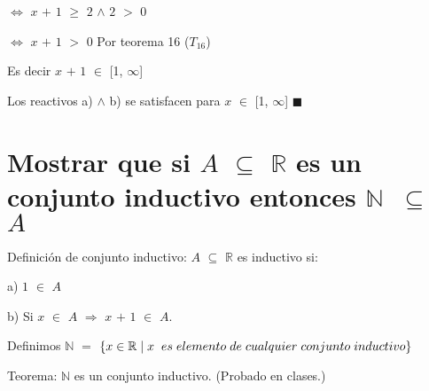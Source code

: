 \documentclass[12pt]{article}
\renewcommand{\qedsymbol}{$\blacksquare$}
\begin{document}
\hspace{5.8cm} $\Longleftrightarrow$  \hspace{0.2cm} $x$ $+$ $1$ $\geq$ $2$ \hspace{0.2cm} $\wedge$ \hspace{0.2cm} $2$ $>$ $0$      \vspace{0.5cm} 

\hspace{5.8cm} $\Longleftrightarrow$  \hspace{0.2cm} $x$ $+$ $1$  $>$ $0$ \hspace{0.5cm} {\textcolor{carrotorange}{Por teorema 16 ($T_{16}$)}}     \vspace{0.5cm} 

Es decir  $x$ $+$ $1$ $\in$ [1, $\infty$]  \vspace{0.5cm}

Los reactivos a) $\wedge$ b) se satisfacen para $x$ $\in$ [1, $\infty$] \hspace{1cm} \qedsymbol

\newpage


\section{\textsf{Mostrar que si $A$ $\subseteq$ $\mathbb{R}$ es un conjunto inductivo entonces \mbox{$\mathbb{N}$ $\subseteq$ $A$}}} \vspace{0.5cm}

Definición de conjunto inductivo: $A$ $\subseteq$ $\mathbb{R}$ es inductivo si: \vspace{0.5cm}

a) $1$ $\in$ $A$ 

b) Si $x$ $\in$ $A$ \hspace{0.2cm} $\Longrightarrow$ \hspace{0.2cm} $x$ $+$ $1$ $\in$ $A$.

Definimos $\mathbb{N}$ $=$ $\left\{ x \in  \mathbb{R} \mid  x \hspace{0.2cm} es \hspace{0.1cm} elemento \hspace{0.1cm} de \hspace{0.1cm} cualquier \hspace{0.1cm} conjunto \hspace{0.1cm} inductivo \right\}$

Teorema: $\mathbb{N}$ es un conjunto inductivo. (Probado en clases.)
\end{document}
